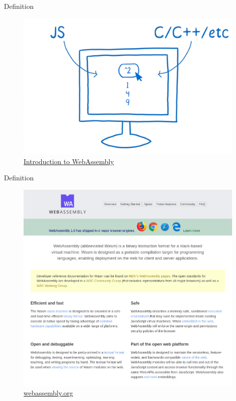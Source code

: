 \documentclass{beamer}
\begin{document}
\begin{frame}{Definition}
    \begin{figure}
        \includegraphics[scale=0.2]{./images/definition.png}
        \caption{\href{https://www.smashingmagazine.com/2017/05/abridged-cartoon-introduction-webassembly/}{Introduction to WebAssembly}}
    \end{figure}
\end{frame}

\begin{frame}{Definition}
    \begin{figure}
        \includegraphics[scale=0.2]{./images/webassembly_org.png}
        \caption{\href{https://webassembly.org/}{webassembly.org}}
    \end{figure}
\end{frame}
\end{document}
